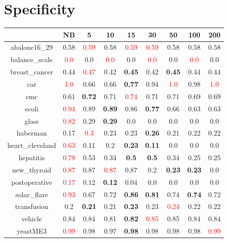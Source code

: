 \documentclass{article}%
\begin{document}
\section*{Specificity}%
\begin{tabular}{c|cccccccc}%
\hline%
&NB&5&10&15&30&50&100&200\\%
\hline%
abalone16\_29&0.58&\textcolor{red}{ 
0.59
}&0.58&\textcolor{red}{ 
0.59
}&\textcolor{red}{ 
0.59
}&0.58&0.58&0.58\\%
\hline%
balance\_scale&\textcolor{red}{ 
0.0
}&0.0&\textcolor{red}{ 
0.0
}&0.0&\textcolor{red}{ 
0.0
}&0.0&\textcolor{red}{ 
0.0
}&0.0\\%
\hline%
breast\_cancer&0.44&\textcolor{red}{ 
0.47
}&0.42&\textbf{0.45}&0.42&\textbf{0.45}&0.44&0.44\\%
\hline%
car&\textcolor{red}{ 
1.0
}&0.66&0.66&\textbf{0.77}&0.94&\textcolor{red}{ 
1.0
}&0.98&\textcolor{red}{ 
1.0
}\\%
\hline%
cmc&0.61&\textbf{0.72}&0.71&\textcolor{red}{ 
0.74
}&0.71&0.71&0.69&0.69\\%
\hline%
ecoli&\textcolor{red}{ 
0.94
}&0.89&\textbf{0.89}&0.86&\textbf{0.77}&0.66&0.63&0.63\\%
\hline%
glass&\textcolor{red}{ 
0.82
}&0.29&\textbf{0.29}&0.0&0.0&0.0&0.0&0.0\\%
\hline%
haberman&0.17&\textcolor{red}{ 
0.3
}&0.23&0.23&\textbf{0.26}&0.21&0.22&0.22\\%
\hline%
heart\_cleveland&\textcolor{red}{ 
0.63
}&0.11&0.2&\textbf{0.23}&\textbf{0.11}&0.0&0.0&0.0\\%
\hline%
hepatitis&\textcolor{red}{ 
0.78
}&0.53&0.34&\textbf{0.5}&\textbf{0.5}&0.34&0.25&0.25\\%
\hline%
new\_thyroid&\textcolor{red}{ 
0.87
}&0.87&\textcolor{red}{ 
0.87
}&0.87&0.2&\textbf{0.23}&\textbf{0.23}&0.0\\%
\hline%
postoperative&\textcolor{red}{ 
0.17
}&0.12&\textbf{0.12}&0.04&0.0&0.0&0.0&0.0\\%
\hline%
solar\_flare&\textcolor{red}{ 
0.93
}&0.67&0.72&\textbf{0.86}&\textbf{0.81}&0.74&\textbf{0.74}&0.72\\%
\hline%
transfusion&0.2&\textbf{0.21}&0.21&\textbf{0.23}&0.23&\textcolor{red}{ 
0.24
}&0.22&0.22\\%
\hline%
vehicle&0.84&0.84&0.81&\textbf{0.82}&\textcolor{red}{ 
0.85
}&0.85&0.84&0.84\\%
\hline%
yeastME3&\textcolor{red}{ 
0.99
}&0.98&0.97&\textbf{0.98}&0.98&0.98&0.98&\textcolor{red}{ 
0.99
}\\%

\end{tabular}
\end{document}
